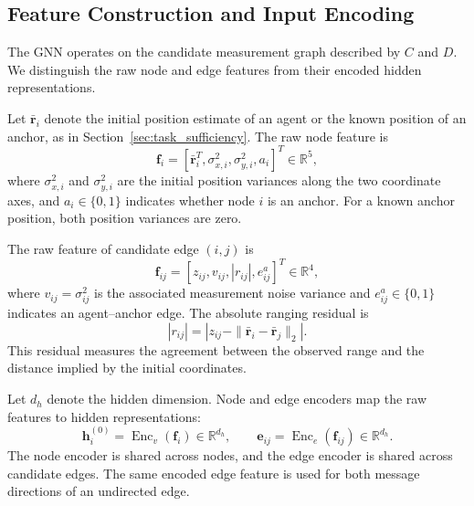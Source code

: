 {\color{blue}

\subsection{Feature Construction and Input Encoding}
\label{sec:feature_construction}
The GNN operates on the candidate measurement graph described by $C$ and $D$. We distinguish the raw node and edge features from their encoded hidden representations.

Let $\bar{\mathbf r}_i$ denote the initial position estimate of an agent or the known position of an anchor, as in Section~\ref{sec:task_sufficiency}. The raw node feature is
\[
    \mathbf f_i
    =
    \left[
    \bar{\mathbf r}_i^{T},
    \sigma_{x,i}^{2},
    \sigma_{y,i}^{2},
    a_i
    \right]^{T}
    \in\mathbb R^{5},
\]
where $\sigma_{x,i}^{2}$ and $\sigma_{y,i}^{2}$ are the initial position variances along the two coordinate axes, and $a_i\in\{0,1\}$ indicates whether node $i$ is an anchor. For a known anchor position, both position variances are zero.

The raw feature of candidate edge $(i,j)$ is
\[
    \mathbf f_{ij}
    =
    \left[
    z_{ij},
    v_{ij},
    |r_{ij}|,
    e_{ij}^{a}
    \right]^{T}
    \in\mathbb R^{4},
\]
where $v_{ij}=\sigma_{ij}^{2}$ is the associated measurement noise variance and $e_{ij}^{a}\in\{0,1\}$ indicates an agent--anchor edge. The absolute ranging residual is
\begin{equation}
    |r_{ij}|
    =
    \left|
    z_{ij}
    -
    \|\bar{\mathbf r}_i-\bar{\mathbf r}_j\|_2
    \right|.
    \label{eq:residual_def}
\end{equation}
This residual measures the agreement between the observed range and the distance implied by the initial coordinates.

Let $d_h$ denote the hidden dimension. Node and edge encoders map the raw features to hidden representations:
\[
    \mathbf h_i^{(0)}
    =
    \operatorname{Enc}_v(\mathbf f_i)
    \in\mathbb R^{d_h},
    \qquad
    \mathbf e_{ij}
    =
    \operatorname{Enc}_e(\mathbf f_{ij})
    \in\mathbb R^{d_h}.
\]
The node encoder is shared across nodes, and the edge encoder is shared across candidate edges. The same encoded edge feature is used for both message directions of an undirected edge.

}

